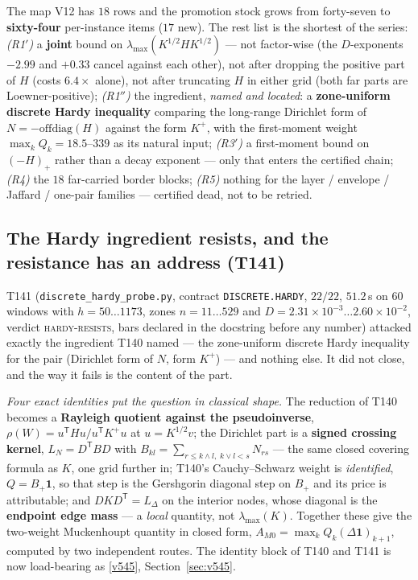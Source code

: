 \documentclass[11pt,a4paper]{article}
\begin{document}
\begin{keybox}
The map V12 has $18$ rows and the promotion stock grows from forty-seven to \textbf{sixty-four}
per-instance items ($17$ new). The rest list is the shortest of the series: \emph{(R1$'$)} a
\textbf{joint} bound on $\lambda_{\max}(K^{1/2}HK^{1/2})$ --- not factor-wise (the $D$-exponents
$-2.99$ and $+0.33$ cancel against each other), not after dropping the positive part of $H$
(costs $6.4\times$ alone), not after truncating $H$ in either grid (both far parts are
Loewner-positive); \emph{(R1$''$)} the ingredient, \emph{named and located}: a
\textbf{zone-uniform discrete Hardy inequality} comparing the long-range Dirichlet form of
$N=-\mathrm{offdiag}(H)$ against the form $K^{+}$, with the first-moment weight
$\max_kQ_k=18.5$--$339$ as its natural input; \emph{(R3$'$)} a first-moment bound on $(-H)_+$
rather than a decay exponent --- only that enters the certified chain; \emph{(R4)} the $18$
far-carried border blocks; \emph{(R5)} nothing for the layer / envelope / Jaffard / one-pair
families --- certified dead, not to be retried.
\end{keybox}

\subsection{The Hardy ingredient resists, and the resistance has an address (T141)}
T141 (\texttt{discrete\_hardy\_probe.py}, contract \texttt{DISCRETE.HARDY}, $22/22$, $51.2$\,s on
$60$ windows with $h=50\ldots1173$, zones $n=11\ldots529$ and $D=2.31\times10^{-3}\ldots
2.60\times10^{-2}$, verdict \textsc{hardy-resists}, bars declared in the docstring before any
number) attacked exactly the
ingredient T140 named --- the zone-uniform discrete Hardy inequality for the pair (Dirichlet form
of $N$, form $K^{+}$) --- and nothing else. It did not close, and the way it fails is the content
of the part.

\emph{Four exact identities put the question in classical shape.} The reduction of T140 becomes a
\textbf{Rayleigh quotient against the pseudoinverse}, $\rho(W)=u^{\mathsf T}Hu/u^{\mathsf T}K^{+}u$
at $u=K^{1/2}v$; the Dirichlet part is a \textbf{signed crossing kernel},
$L_N=D^{\mathsf T}BD$ with $B_{kl}=\sum_{r\le k\wedge l,\;k\vee l<s}N_{rs}$ --- the same closed
covering formula as $K$, one grid further in; T140's Cauchy--Schwarz weight is \emph{identified},
$Q=B_+\mathbf 1$, so that step is the Gershgorin diagonal step on $B_+$ and its price is
attributable; and $DKD^{\mathsf T}=L_\Delta$ on the interior nodes, whose diagonal is the
\textbf{endpoint edge mass} --- a \emph{local} quantity, not $\lambda_{\max}(K)$. Together these
give the two-weight Muckenhoupt quantity in closed form,
$A_{M0}=\max_kQ_k(\Delta\mathbf 1)_{k+1}$, computed by two independent routes. The identity block
of T140 and T141 is now load-bearing as \vref{v545}, Section~\ref{sec:v545}.
\end{document}
